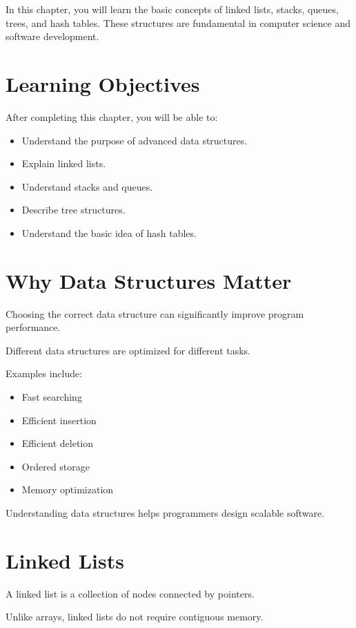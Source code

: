 \documentclass[12pt,openany]{book}
\begin{document}
In this chapter, you will learn the basic concepts of linked lists, stacks, queues, trees, and hash tables. These structures are fundamental in computer science and software development.

\section{Learning Objectives}

After completing this chapter, you will be able to:

\begin{itemize}
    \item Understand the purpose of advanced data structures.
    \item Explain linked lists.
    \item Understand stacks and queues.
    \item Describe tree structures.
    \item Understand the basic idea of hash tables.
\end{itemize}

\section{Why Data Structures Matter}

Choosing the correct data structure can significantly improve program performance.

Different data structures are optimized for different tasks.

Examples include:

\begin{itemize}
    \item Fast searching
    \item Efficient insertion
    \item Efficient deletion
    \item Ordered storage
    \item Memory optimization
\end{itemize}

Understanding data structures helps programmers design scalable software.

\section{Linked Lists}

A linked list is a collection of nodes connected by pointers.

Unlike arrays, linked lists do not require contiguous memory.
\end{document}
